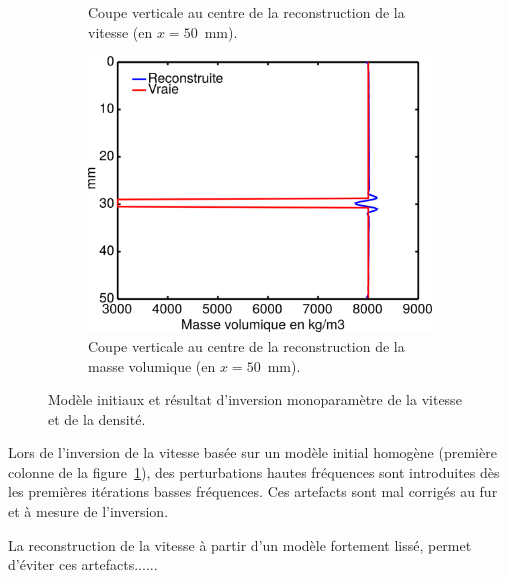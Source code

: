 \begin{figure}[!h]
\begin{changemargin}{-2cm}{-2cm}
\begin{subfigure}[b]{0.29\textwidth}
			\caption{Coupe verticale au centre de la reconstruction de la vitesse (en $x=50$~mm).}
		\end{subfigure}
		\begin{subfigure}[b]{0.29\textwidth}
			\caption{ }
		\end{subfigure}
		\begin{subfigure}[b]{0.29\textwidth}
			\includegraphics[width=\textwidth]{img/mono_param/coupe_rho_mono_vert.png}
			\caption{Coupe verticale au centre de la reconstruction de la masse volumique (en $x=50$~mm).}
		\end{subfigure}
		\caption{\label{app:inv_mono} Modèle initiaux et résultat d'inversion monoparamètre de la vitesse et de la densité.}
	\end{changemargin}
	\end{figure}

 
Lors de l'inversion de la vitesse basée sur  un modèle initial homogène (première colonne de la figure~\ref{app:inv_mono}), des perturbations hautes fréquences sont introduites dès les premières itérations basses fréquences. Ces artefacts sont mal corrigés au fur et à mesure de l'inversion.\\

La reconstruction de la vitesse à partir d'un modèle fortement lissé, permet d'éviter ces artefacts......

